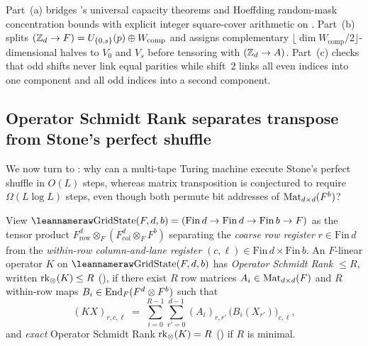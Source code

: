 \begin{outline}
Part~(a) bridges \cite{SharedDecoders2026}'s universal capacity theorems and Hoeffding random-mask
concentration bounds with explicit integer square-cover arithmetic on .
Part~(b) splits $(\mathbb{Z}_d \to F) = U_{\{0,s\}}(p) \oplus W_{\mathrm{comp}}$ and assigns complementary
$\lfloor \dim W_{\mathrm{comp}} / 2 \rfloor$-dimensional halves to $V_0$ and $V_s$ before tensoring
with $(\mathbb{Z}_d \to A)$. Part~(c) checks that odd shifts never link equal parities while shift~$2$ links
all even indices into one component and all odd indices into a second component.
\end{outline}

\subsection{Operator Schmidt Rank separates transpose from Stone's perfect shuffle}\label{sec:osr}

We now turn to \cite[Problem~9.5]{SeventeenthPaper2026}: why can a multi-tape Turing machine execute
Stone's perfect shuffle \cite{Stone1971} in $O(L)$ steps, whereas matrix transposition is conjectured
to require $\Omega(L\log L)$ steps, even though both permute bit addresses of $\operatorname{Mat}_{d\times d}(F^b)$?

View $\lean{GridState}(F, d, b) = (\mathrm{Fin}\,d \to \mathrm{Fin}\,d \to \mathrm{Fin}\,b \to F)$
as the tensor product $F_{\mathrm{row}}^d \otimes_F (F_{\mathrm{col}}^d \otimes_F F^b)$ separating
the \emph{coarse row register} $r \in \mathrm{Fin}\,d$ from the \emph{within-row column-and-lane
register} $(c, \ell) \in \mathrm{Fin}\,d \times \mathrm{Fin}\,b$. An $F$-linear operator $K$ on
$\lean{GridState}(F, d, b)$ has \emph{Operator Schmidt Rank $\le R$}, written $\operatorname{rk}_{\otimes}(K) \le R$
(), if there exist $R$ row matrices $A_i \in \operatorname{Mat}_{d\times d}(F)$ and
$R$ within-row maps $B_i \in \operatorname{End}_F(F^d \otimes F^b)$ such that
\[
  (K X)_{r,c,\ell} \;=\; \sum_{i=0}^{R-1} \sum_{r'=0}^{d-1} (A_i)_{r,r'}\,\bigl(B_i(X_{r'})\bigr)_{c,\ell},
\]
and \emph{exact} Operator Schmidt Rank $\operatorname{rk}_{\otimes}(K) = R$ () if $R$ is
minimal.

